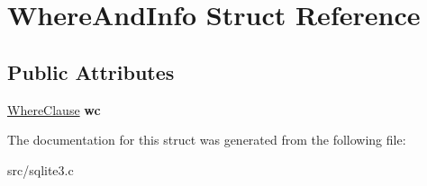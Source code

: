 \hypertarget{struct_where_and_info}{\section{Where\-And\-Info Struct Reference}
\label{struct_where_and_info}
}
\subsection*{Public Attributes}
\begin{DoxyCompactItemize}
\item 
\hypertarget{struct_where_and_info_a01cea99f069b1e598004a1cd0d0c3a80}{\hyperlink{struct_where_clause}{Where\-Clause} {\bfseries wc}}\label{struct_where_and_info_a01cea99f069b1e598004a1cd0d0c3a80}

\end{DoxyCompactItemize}


The documentation for this struct was generated from the following file\-:\begin{DoxyCompactItemize}
\item 
src/sqlite3.\-c\end{DoxyCompactItemize}
